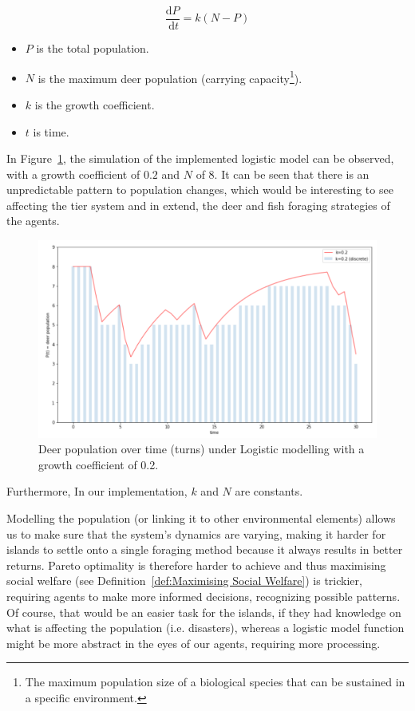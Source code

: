 \begin{equation}
\frac{\mathrm{d} P}{\mathrm{~d} t}=k(N-P)
\label{eq:Population Density}
\end{equation}

\begin{itemize}
    \item $P$ is the total population. 
    \item $N$ is the maximum deer population (carrying capacity\footnote{The maximum population size of a biological species that can be sustained in a specific environment.}).
    \item $k$ is the growth coefficient.
    \item $t$ is time.
\end{itemize}

In Figure~\ref{fig:Deer population over time}, the simulation of the implemented logistic model can be observed, with a growth coefficient of $0.2$ and $N$ of 8. It can be seen that there is an unpredictable pattern to population changes, which would be interesting to see affecting the tier system and in extend, the deer and fish foraging strategies of the agents.

\begin{figure}[!htb]
    \centering
    \includegraphics[width=1\textwidth]{04_environment/images/Deer population over time.PNG}
    \caption{Deer population over time (turns) under Logistic modelling with a growth coefficient of 0.2.}
    \label{fig:Deer population over time}
\end{figure}

Furthermore, In our implementation, $k$ and $N$ are constants. 

Modelling the population (or linking it to other environmental elements) allows us to make sure that the system’s dynamics are varying, making it harder for islands to settle onto a single foraging method because it always results in better returns. Pareto optimality is therefore harder to achieve and thus maximising social welfare (see Definition~\ref{def:Maximising Social Welfare}) is trickier, requiring agents to make more informed decisions, recognizing possible patterns. Of course, that would be an easier task for the islands, if they had knowledge on what is affecting the population (i.e. disasters), whereas a logistic model function might be more abstract in the eyes of our agents, requiring more processing. 

